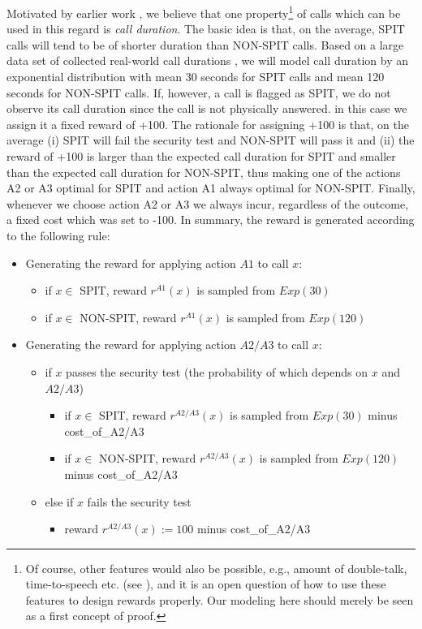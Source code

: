 \documentclass{llncs}
\begin{document}
Motivated by earlier work \cite{SPRIT-SPIT}, we believe that one property\footnote{Of course, other features
would also be possible, e.g., amount of double-talk, time-to-speech etc. (see \cite{SPRIT-SPIT}),
and it is an open question of how to use these features to design rewards properly. Our modeling here should merely be 
seen as a first concept of proof.} of calls which can be used
in this regard is {\em call duration}. The basic idea is that,
on the average, SPIT calls will tend to be of shorter duration than NON-SPIT calls. 
Based on a large data set of collected real-world call durations \cite{eagle09realitydata},
we will model call duration by an exponential distribution with mean
30 seconds for SPIT calls and mean 120 seconds for NON-SPIT calls. 
If, however, a call is flagged as SPIT, we do not observe its call duration
since the call is not physically answered. in this case we assign it a fixed 
reward of +100. The rationale for assigning +100 is that, on the
average (i) SPIT will fail the security test and NON-SPIT will pass it and (ii) the reward
of +100 is larger than the expected call duration for SPIT and smaller than the expected call
duration for NON-SPIT, thus making one of the actions A2 or A3 optimal for SPIT and action 
A1 always optimal for NON-SPIT.
Finally, whenever we choose action A2 or A3 we always incur, regardless of the outcome, a fixed
cost which was set to -100. In summary, the reward is generated according to the following
rule:
\begin{itemize}
 \footnotesize
 \item Generating the reward for applying action $A1$ to call $x$:
     \begin{itemize}
        \item if $x \in $ SPIT, reward $r^{A1}(x)$ is sampled from $Exp(30)$
        \item if $x \in $ NON-SPIT, reward $r^{A1}(x)$ is sampled from $Exp(120)$ 
     \end{itemize}
 \item Generating the reward for applying action $A2/A3$ to call $x$:
     \begin{itemize}
        \item if $x$ passes the security test (the probability of which depends on $x$ and $A2/A3$)
        \begin{itemize}
            \item if $x \in $ SPIT, reward $r^{A2/A3}(x)$ is sampled from $Exp(30)$ minus cost\_of\_A2/A3
            \item if $x \in $ NON-SPIT, reward $r^{A2/A3}(x)$ is sampled from $Exp(120)$ minus cost\_of\_A2/A3
        \end{itemize}
        \item else if $x$ fails the security test
        \begin{itemize}
            \item reward $r^{A2/A3}(x):=100$ minus cost\_of\_A2/A3 
        \end{itemize}
    \end{itemize} 
\end{itemize}
\end{document}
